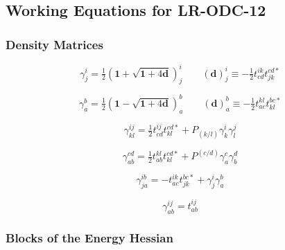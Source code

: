 \begin{subappendices}
    \subsection{Working Equations for LR-ODC-12}

    \subsubsection{Density Matrices}

    \begin{equation}
        \gamma^i_j
        =
        \tfrac{1}{2}
        (
            \mathbf{1}
            +
            \sqrt{\mathbf{1} + 4\mathbf{d}}
        )_j^i
        \qquad
        (\mathbf{d})_j^i
        \equiv
        -
        \tfrac{1}{2}
        t_{cd}^{ik}
        t_{jk}^{cd*}
    \end{equation}

    \begin{equation}
        \gamma^b_a
        =
        \tfrac{1}{2}
        (
            \mathbf{1}
            -
            \sqrt{\mathbf{1} + 4\mathbf{d}}
        )_a^b
        \qquad
        (\mathbf{d})_a^b
        \equiv
        -
        \tfrac{1}{2}
        t_{ac}^{kl}
        t_{kl}^{bc*}
    \end{equation}

    \begin{equation}
        \gamma^{ij}_{kl}
        =
        \tfrac{1}{2}
        t_{cd}^{ij}
        t_{kl}^{cd*}
        +
        P_{(k/l)}
        \gamma^i_k
        \gamma^j_l
    \end{equation}

    \begin{equation}
        \gamma_{ab}^{cd}
        =
        \tfrac{1}{2}
        t_{ab}^{kl}
        t_{kl}^{cd*}
        +
        P^{(c/d)}
        \gamma_a^c
        \gamma_b^d
    \end{equation}

    \begin{equation}
        \gamma_{ja}^{ib}
        =
        -
        t_{ac}^{ik}
        t_{jk}^{bc*}
        +
        \gamma^i_j
        \gamma_a^b
    \end{equation}

    \begin{equation}
        \gamma_{ab}^{ij}
        =
        t_{ab}^{ij}
    \end{equation}


    \subsubsection{Blocks of the Energy Hessian}


\end{subappendices}
